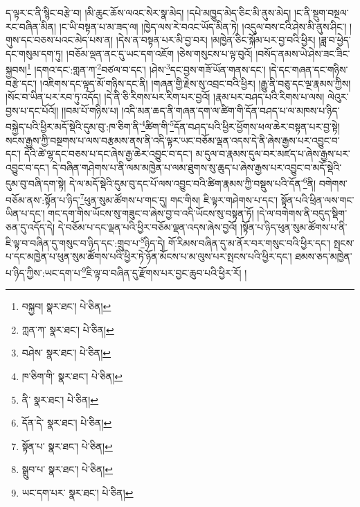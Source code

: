 ད་ལྟར་ང་ནི་སྙིང་བརྩེ་བ། །མི་ཆུང་ཆོས་ལའང་སེར་སྣ་མེད། །དཔེ་མཁྱུད་མེད་ཅིང་མི་ནུས་མེད། །ང་ནི་སྡུག་བསྔལ་རང་བཞིན་མིན། །ང་ཡི་བསྟན་པ་མ་ཟད་ལ། །ཁྱེད་ལས་རེ་བའང་ཡོད་མིན་ཏེ། །འདུལ་བས་ངའི་ཤེས་མི་ནུས་ཤིང་། །གུས་དང་བཅས་པའང་མེད་པས་ན། །དེས་ན་བསྟན་པར་མི་བྱ་བར། །མཁྱེན་ཅིང་སྐོམ་པར་བྱ་བའི་ཕྱིར། །ཟླ་བ་ཕྱེད་དང་གསུམ་དག་ཏུ། །བཅོམ་ལྡན་ནང་དུ་ཡང་དག་འཇོག །ཅེས་གསུངས་པ་ལྟ་བུའོ། །བསོད་ནམས་ཡེ་ཤེས་ཟང་ཟིང་སྐྱབས།\footnote{བསྐྱབ།  སྣར་ཐང་།  པེ་ཅིན། } །དགའ་དང་:གླན་ཀ་\footnote{ཀླན་ཀ་  སྣར་ཐང་།  པེ་ཅིན། }བཙལ་བ་དང་། །ཤེས་\footnote{བཤེས་  སྣར་ཐང་།  པེ་ཅིན། }དང་བྱས་གཟོ་ཡོན་གནས་དང་། །དེ་དང་གཞན་དང་གཉིས་བརྩེ་དང་། །འཇིགས་དང་ལྟད་མོ་གཉིས་དང་ནི། །གཞན་གྱི་རྗེས་སུ་འབྲང་བའི་ཕྱིར། །རྒྱུ་ནི་བཅུ་དང་ལྔ་རྣམས་ཀྱིས། །སོང་བ་ཡིན་པར་རབ་ཏུ་འདོད། །དེ་ནི་ཅི་རིགས་པར་རིག་པར་བྱའོ། །རྣམ་པར་བཤད་པའི་རིགས་པ་ལས། ལེའུར་བྱས་པ་དང་པོའོ།། །།བམ་པོ་གཉིས་པ། །འདི་མན་ཆད་ནི་གཞན་དག་ལ་ཚིག་གི་དོན་བཤད་པ་ལ་མཁས་པ་ཉིད་བསྐྱེད་པའི་ཕྱིར་མདོ་སྡེའི་དུམ་བུ་:ཁ་ཅིག་ནི་\footnote{ཁ་ཅིག་གི་  སྣར་ཐང་།  པེ་ཅིན། }ཚིག་གི་\footnote{ནི་  སྣར་ཐང་།  པེ་ཅིན། }དོན་བཤད་པའི་ཕྱིར་ཕྱོགས་ཕལ་ཆེར་བསྟན་པར་བྱ་སྟེ། སངས་རྒྱས་ཀྱི་བསྔགས་པ་ལས་བརྩམས་ནས་ནི་འདི་ལྟར་ཡང་བཅོམ་ལྡན་འདས་དེ་ནི་ཞེས་རྒྱས་པར་འབྱུང་བ་དང་། དེའི་ཚེ་ལྷ་དང་བཅས་པ་དང་ཞེས་རྒྱ་ཆེར་འབྱུང་བ་དང་། མ་དུལ་བ་རྣམས་དུལ་བར་མཛད་པ་ཞེས་རྒྱས་པར་འབྱུང་བ་དང་། དེ་བཞིན་གཤེགས་པ་ནི་ལམ་མཁྱེན་པ་ལམ་ཐུགས་སུ་ཆུད་པ་ཞེས་རྒྱས་པར་འབྱུང་བ་མདོ་སྡེའི་དུམ་བུ་བཞི་དག་སྟེ། དེ་ལ་མདོ་སྡེའི་དུམ་བུ་དང་པོ་ལས་འབྱུང་བའི་ཚིག་རྣམས་ཀྱི་བསྡུས་པའི་དོན་\footnote{དོན་དེ་  སྣར་ཐང་།  པེ་ཅིན། }ནི། བགེགས་བཅོམ་ནས་:སྟོན་པ་ཉིད་\footnote{སྟོན་པ་  སྣར་ཐང་།  པེ་ཅིན། }ཕུན་སུམ་ཚོགས་པ་གང་དུ། གང་གིས། ཇི་ལྟར་གཤེགས་པ་དང་། སྟོན་པའི་ཕྲིན་ལས་གང་ཡིན་པ་དང་། གང་དག་གིས་ཡོངས་སུ་གཟུང་བ་ཞེས་བྱ་བ་འདི་ཡོངས་སུ་བསྟན་ཏོ། །དེ་ལ་བགེགས་ནི་བདུད་སྡིག་ཅན་དུ་འདོད་དེ། དེ་བཅོམ་པ་དང་ལྡན་པའི་ཕྱིར་བཅོམ་ལྡན་འདས་ཞེས་བྱའོ། །སྟོན་པ་ཉིད་ཕུན་སུམ་ཚོགས་པ་ནི་ཇི་ལྟ་བ་བཞིན་དུ་གསུང་བ་ཉིད་དང་:གྲུབ་པ་\footnote{སྒྲུབ་པ་  སྣར་ཐང་།  པེ་ཅིན། }ཉིད་དེ། གོ་རིམས་བཞིན་དུ་མ་ནོར་བར་གསུང་བའི་ཕྱིར་དང་། སྤངས་པ་དང་མཁྱེན་པ་ཕུན་སུམ་ཚོགས་པའི་ཕྱིར་ཏེ་ཉོན་མོངས་པ་མ་ལུས་པར་སྤངས་པའི་ཕྱིར་དང་། ཐམས་ཅད་མཁྱེན་པ་ཉིད་ཀྱིས་:ཡང་དག་པ་\footnote{ཡང་དག་པར་  སྣར་ཐང་།  པེ་ཅིན། }ཇི་ལྟ་བ་བཞིན་དུ་རྫོགས་པར་བྱང་ཆུབ་པའི་ཕྱིར་རོ། །
